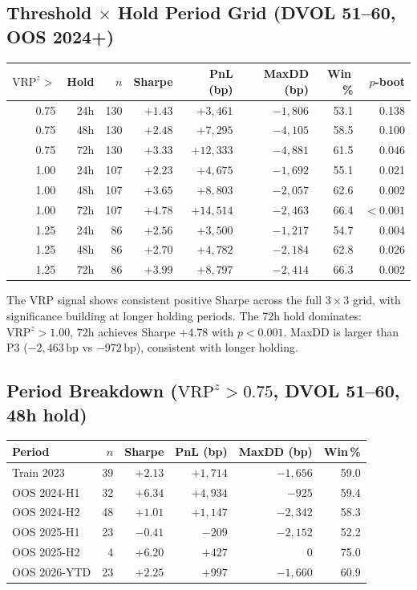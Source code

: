 \documentclass[12pt, a4paper]{article}
\theoremstyle{plain}
\theoremstyle{definition}
\newcommand{\VRP}{\mathrm{VRP}}
\newcommand{\bp}{\,\mathrm{bp}}
\begin{document}
\subsection{Threshold $\times$ Hold Period Grid (DVOL 51--60, OOS 2024+)}

\begin{center}
\begin{tabular}{rrrrrrrr}
\toprule
$\VRP^z >$ & Hold & $n$ & Sharpe & PnL (bp) & MaxDD (bp) & Win\,\% & $p$-boot \\
\midrule
0.75 & 24h & 130 & $+1.43$ & $+3{,}461$  & $-1{,}806$ & 53.1 & 0.138 \\
0.75 & 48h & 130 & $+2.48$ & $+7{,}295$  & $-4{,}105$ & 58.5 & 0.100 \\
0.75 & 72h & 130 & $+3.33$ & $+12{,}333$ & $-4{,}881$ & 61.5 & 0.046 \\
\midrule
1.00 & 24h & 107 & $+2.23$ & $+4{,}675$  & $-1{,}692$ & 55.1 & 0.021 \\
1.00 & 48h & 107 & $+3.65$ & $+8{,}803$  & $-2{,}057$ & 62.6 & 0.002 \\
1.00 & 72h & 107 & $+4.78$ & $+14{,}514$ & $-2{,}463$ & 66.4 & $<0.001$ \\
\midrule
1.25 & 24h &  86 & $+2.56$ & $+3{,}500$  & $-1{,}217$ & 54.7 & 0.004 \\
1.25 & 48h &  86 & $+2.70$ & $+4{,}782$  & $-2{,}184$ & 62.8 & 0.026 \\
1.25 & 72h &  86 & $+3.99$ & $+8{,}797$  & $-2{,}414$ & 66.3 & 0.002 \\
\bottomrule
\end{tabular}
\end{center}

The VRP signal shows consistent positive Sharpe across the full $3 \times 3$
grid, with significance building at longer holding periods.  The 72h
hold dominates: $\VRP^z > 1.00$, 72h achieves Sharpe $+4.78$ with
$p < 0.001$.  MaxDD is larger than P3 ($-2{,}463\bp$ vs $-972\bp$),
consistent with longer holding.

\subsection{Period Breakdown ($\VRP^z > 0.75$, DVOL 51--60, 48h hold)}

\begin{center}
\begin{tabular}{lrrrrr}
\toprule
Period & $n$ & Sharpe & PnL (bp) & MaxDD (bp) & Win\,\% \\
\midrule
Train 2023    & 39 & $+2.13$ & $+1{,}714$ & $-1{,}656$ & 59.0 \\
OOS 2024-H1   & 32 & $+6.34$ & $+4{,}934$ & $-925$     & 59.4 \\
OOS 2024-H2   & 48 & $+1.01$ & $+1{,}147$ & $-2{,}342$ & 58.3 \\
OOS 2025-H1   & 23 & $-0.41$ & $-209$     & $-2{,}152$ & 52.2 \\
OOS 2025-H2   &  4 & $+6.20$ & $+427$     & $0$        & 75.0 \\
OOS 2026-YTD  & 23 & $+2.25$ & $+997$     & $-1{,}660$ & 60.9 \\
\bottomrule
\end{tabular}
\end{center}
\end{document}
